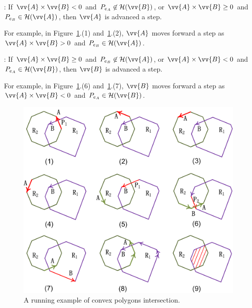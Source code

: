 : If $\vv{A} \times \vv{B} < 0$ and $P_{e_A} \not \in \mathcal{H}(\vv{B})$, or $\vv{A} \times \vv{B} \ge 0$ and $P_{e_B} \in \mathcal{H}(\vv{A})$, then $\vv{A}$ is advanced a step.

For example, in Figure~\ref{fig:c-poly-inter}.(1) and~\ref{fig:c-poly-inter}.(2), $\vv{A}$ moves forward a step as  $\vv{A} \times \vv{B} > 0$ and $P_{e_B} \in \mathcal{H}(\vv{A})$.

: If $\vv{A} \times \vv{B} \ge 0$ and $P_{e_B} \not \in \mathcal{H}(\vv{A})$, or $\vv{A} \times \vv{B} < 0$ and $P_{e_A} \in \mathcal{H}(\vv{B})$, then  $\vv{B}$ is advanced a step.


For example, in Figure~\ref{fig:c-poly-inter}.(6) and~\ref{fig:c-poly-inter}.(7), $\vv{B}$ moves forward a step as $\vv{A} \times \vv{B} < 0$ and $P_{e_A} \in \mathcal{H}(\vv{B})$.


\begin{figure}[tb!]
	\centering
	\includegraphics[scale=0.92]{figures/Fig-convex-poly-inter.png}
	\caption{\small A running example of convex polygons intersection.}
	\vspace{-1ex}
	\label{fig:c-poly-inter}
\end{figure}


